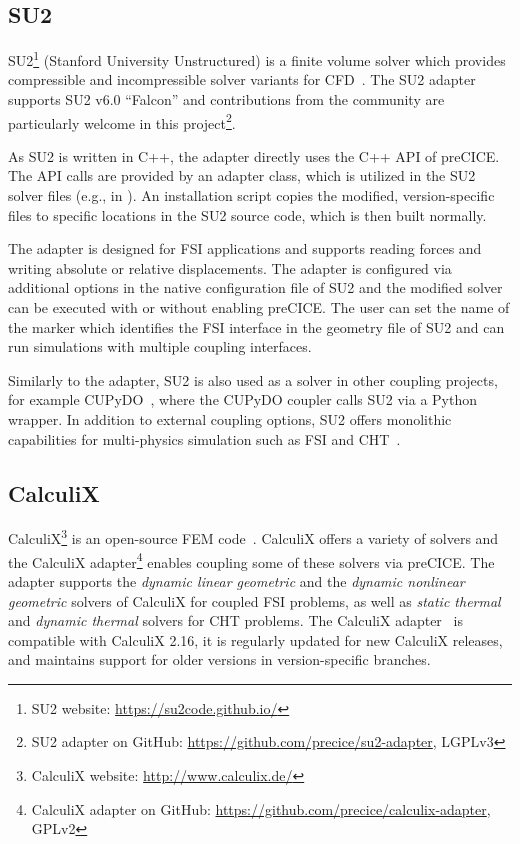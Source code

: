 \subsection{SU2} 

SU2\footnote{SU2 website: \url{https://su2code.github.io/}} (Stanford University Unstructured) is a finite volume solver which provides compressible and incompressible solver variants for CFD~\cite{SU2-paper}. The SU2 adapter~\cite{AlexRusch2016} supports SU2 v6.0 ``Falcon'' and contributions from the community are particularly welcome in this project\footnote{SU2 adapter on GitHub: \url{https://github.com/precice/su2-adapter}, LGPLv3}.

As SU2 is written in C++, the adapter directly uses the C++ API of preCICE. The API calls are provided by an adapter class, which is utilized in the SU2 solver files (e.g., in ). An installation script copies the modified, version-specific files to specific locations in the SU2 source code, which is then built normally.

The adapter is designed for FSI applications and supports reading forces and writing absolute or relative displacements. The adapter is configured via additional options in the native configuration file of SU2 and the modified solver can be executed with or without enabling preCICE. The user can set the name of the marker which identifies the FSI interface in the geometry file of SU2 and can run simulations with multiple coupling interfaces.

Similarly to the adapter, SU2 is also used as a solver in other coupling projects, for example CUPyDO~\cite{CUPyDO-THOMAS201969}, where the CUPyDO coupler calls SU2 via a Python wrapper. In addition to external coupling options, SU2 offers monolithic capabilities for multi-physics simulation such as FSI and CHT~\cite{SU2-multiphysics, SU2-FSI-monolithic}.


\subsection{CalculiX} 

CalculiX\footnote{CalculiX website: \url{http://www.calculix.de/}} is an open-source FEM code~\cite{Dhondt2004_CalculiX}. CalculiX offers a variety of solvers and the CalculiX adapter\footnote{CalculiX adapter on GitHub: \url{https://github.com/precice/calculix-adapter}, GPLv2} enables coupling some of these solvers via preCICE. The adapter supports the \emph{dynamic linear geometric} and the \emph{dynamic nonlinear geometric} solvers of CalculiX for coupled FSI problems, as well as \emph{static thermal} and \emph{dynamic thermal} solvers for CHT problems. The CalculiX adapter~\cite{CheungYau2016, Uekermann2017_Adapters} is compatible with CalculiX 2.16, it is regularly updated for new CalculiX releases, and maintains support for older versions in version-specific branches.

